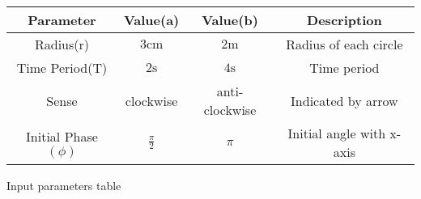 \centering
\begin{tabular}{|c|c|c|c|}
        \hline
        \textbf{Parameter} & \textbf{Value(a)} & \textbf{Value(b)} & \textbf{Description}\\
        \hline
	Radius(r) & $3\text{cm}$ & $2\text{m}$ & Radius of each circle \\
        \hline
	Time Period(T) & $2\text{s}$ & $4\text{s}$ & Time period \\
	\hline
	Sense & clockwise & anti-clockwise & Indicated by arrow\\
	\hline
	Initial Phase$(\phi)$ & $\frac{\pi}{2}$ & $\pi$ & Initial angle with x-axis\\
	\hline
\end{tabular}
\caption{Input parameters table}
\label{tab:11.14.11}
